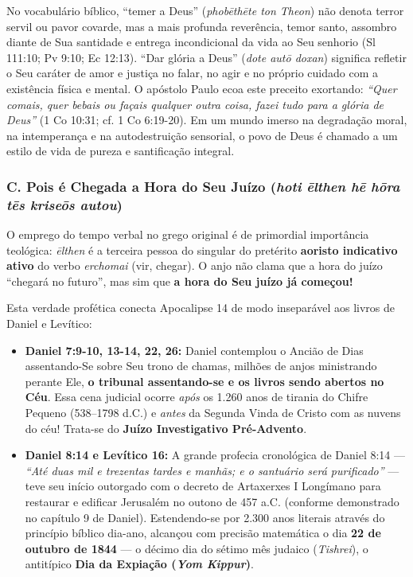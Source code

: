 No vocabulário bíblico, ``temer a Deus'' (\textit{phobēthēte ton Theon}) não denota terror servil ou pavor covarde, mas a mais profunda reverência, temor santo, assombro diante de Sua santidade e entrega incondicional da vida ao Seu senhorio (Sl 111:10; Pv 9:10; Ec 12:13). ``Dar glória a Deus'' (\textit{dote autō doxan}) significa refletir o Seu caráter de amor e justiça no falar, no agir e no próprio cuidado com a existência física e mental. O apóstolo Paulo ecoa este preceito exortando: \textit{``Quer comais, quer bebais ou façais qualquer outra coisa, fazei tudo para a glória de Deus''} (1 Co 10:31; cf. 1 Co 6:19-20). Em um mundo imerso na degradação moral, na intemperança e na autodestruição sensorial, o povo de Deus é chamado a um estilo de vida de pureza e santificação integral.


\subsubsection*{C. Pois é Chegada a Hora do Seu Juízo (\textit{hoti ēlthen hē hōra tēs kriseōs autou})}

O emprego do tempo verbal no grego original é de primordial importância teológica: \textit{ēlthen} é a terceira pessoa do singular do pretérito \textbf{aoristo indicativo ativo} do verbo \textit{erchomai} (vir, chegar). O anjo não clama que a hora do juízo ``chegará no futuro'', mas sim que \textbf{a hora do Seu juízo já começou!}

Esta verdade profética conecta Apocalipse 14 de modo inseparável aos livros de Daniel e Levítico:
\begin{itemize}
  \item \textbf{Daniel 7:9-10, 13-14, 22, 26:} Daniel contemplou o Ancião de Dias assentando-Se sobre Seu trono de chamas, milhões de anjos ministrando perante Ele, \textbf{o tribunal assentando-se e os livros sendo abertos no Céu}. Essa cena judicial ocorre \textit{após} os 1.260 anos de tirania do Chifre Pequeno (538–1798 d.C.) e \textit{antes} da Segunda Vinda de Cristo com as nuvens do céu! Trata-se do \textbf{Juízo Investigativo Pré-Advento}.
  \item \textbf{Daniel 8:14 e Levítico 16:} A grande profecia cronológica de Daniel 8:14 — \textit{``Até duas mil e trezentas tardes e manhãs; e o santuário será purificado''} — teve seu início outorgado com o decreto de Artaxerxes I Longímano para restaurar e edificar Jerusalém no outono de 457 a.C. (conforme demonstrado no capítulo 9 de Daniel). Estendendo-se por 2.300 anos literais através do princípio bíblico dia-ano, alcançou com precisão matemática o dia \textbf{22 de outubro de 1844} — o décimo dia do sétimo mês judaico (\textit{Tishrei}), o antitípico \textbf{Dia da Expiação (\textit{Yom Kippur})}.
\end{itemize}



